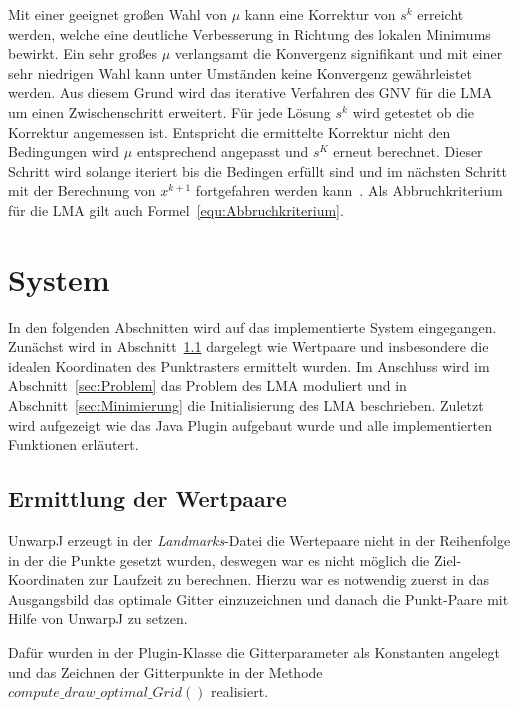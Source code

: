 Mit einer geeignet großen Wahl von $\mu$ kann eine Korrektur von $s^k$ erreicht werden, welche eine deutliche Verbesserung in Richtung des lokalen Minimums bewirkt. Ein sehr großes $\mu$ verlangsamt die Konvergenz signifikant und mit einer sehr niedrigen Wahl kann unter Umständen keine Konvergenz gewährleistet werden. Aus diesem Grund wird das iterative Verfahren des GNV für die LMA um einen Zwischenschritt erweitert. Für jede Lösung $s^k$ wird getestet ob die Korrektur angemessen ist. Entspricht die ermittelte Korrektur nicht den Bedingungen wird $\mu$ entsprechend angepasst und $s^K$ erneut berechnet. Dieser Schritt wird solange iteriert bis die Bedingen erfüllt sind und im nächsten Schritt mit der Berechnung von $x^{k+1}$ fortgefahren werden kann~\cite{dahmen2008numerik}. Als Abbruchkriterium für die LMA gilt auch Formel~\ref{equ:Abbruchkriterium}.

 

\section{System}
\label{sec:System}

In den folgenden Abschnitten wird auf das implementierte System eingegangen. Zunächst wird in Abschnitt~\ref{sec:Wertpaare} dargelegt wie Wertpaare und insbesondere die idealen Koordinaten des Punktrasters ermittelt wurden. Im Anschluss wird im Abschnitt~\ref{sec:Problem} das Problem des LMA moduliert und in Abschnitt~\ref{sec:Minimierung} die Initialisierung des LMA beschrieben. Zuletzt wird aufgezeigt wie das Java Plugin aufgebaut wurde und alle implementierten Funktionen erläutert.


\subsection{Ermittlung der Wertpaare}
\label{sec:Wertpaare}

UnwarpJ erzeugt in der \textit{Landmarks}-Datei die Wertepaare nicht in der Reihenfolge in der die Punkte gesetzt wurden, deswegen war es nicht möglich die Ziel-Koordinaten zur Laufzeit zu berechnen. Hierzu war es notwendig zuerst in das Ausgangsbild das optimale Gitter einzuzeichnen und danach die Punkt-Paare mit Hilfe von UnwarpJ zu setzen.

Dafür wurden in der Plugin-Klasse die Gitterparameter als Konstanten angelegt und das Zeichnen der Gitterpunkte in der Methode $compute\_draw\_optimal\_Grid()$ realisiert.

